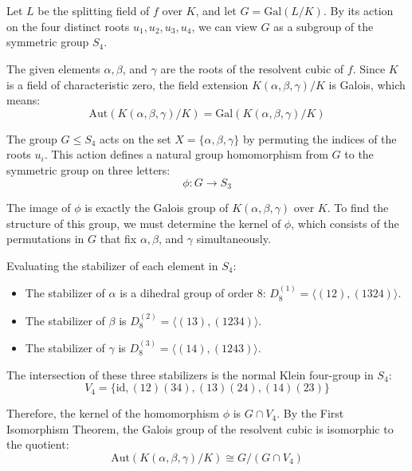 \documentclass[12pt]{article}
\title{\mytitle}
\author{\myauthor}
\date{\today}
\theoremstyle{definition}
\theoremstyle{remark}
\begin{document}
\maketitle

\section{} %
Let $L$ be the splitting field of $f$ over $K$, and let $G = \mathrm{Gal}(L/K)$. By its action on the four distinct roots $u_1, u_2, u_3, u_4$, we can view $G$ as a subgroup of the symmetric group $S_4$.

The given elements $\alpha, \beta$, and $\gamma$ are the roots of the resolvent cubic of $f$. Since $K$ is a field of characteristic zero, the field extension $K(\alpha, \beta, \gamma)/K$ is Galois, which means:
\[
\mathrm{Aut}(K(\alpha, \beta, \gamma)/K) = \mathrm{Gal}(K(\alpha, \beta, \gamma)/K)
\]

The group $G \le S_4$ acts on the set $X = \{\alpha, \beta, \gamma\}$ by permuting the indices of the roots $u_i$. This action defines a natural group homomorphism from $G$ to the symmetric group on three letters:
\[
\phi: G \to S_3
\]

The image of $\phi$ is exactly the Galois group of $K(\alpha, \beta, \gamma)$ over $K$. To find the structure of this group, we must determine the kernel of $\phi$, which consists of the permutations in $G$ that fix $\alpha, \beta$, and $\gamma$ simultaneously. 

Evaluating the stabilizer of each element in $S_4$:
\begin{itemize}
    \item The stabilizer of $\alpha$ is a dihedral group of order 8: $D_8^{(1)} = \langle(12), (1324)\rangle$.
    \item The stabilizer of $\beta$ is $D_8^{(2)} = \langle(13), (1234)\rangle$.
    \item The stabilizer of $\gamma$ is $D_8^{(3)} = \langle(14), (1243)\rangle$.
\end{itemize}

The intersection of these three stabilizers is the normal Klein four-group in $S_4$:
\[
V_4 = \{ \mathrm{id}, (12)(34), (13)(24), (14)(23) \}
\]

Therefore, the kernel of the homomorphism $\phi$ is $G \cap V_4$. By the First Isomorphism Theorem, the Galois group of the resolvent cubic is isomorphic to the quotient:
\[
\mathrm{Aut}(K(\alpha, \beta, \gamma)/K) \cong G / (G \cap V_4)
\]
\end{document}
